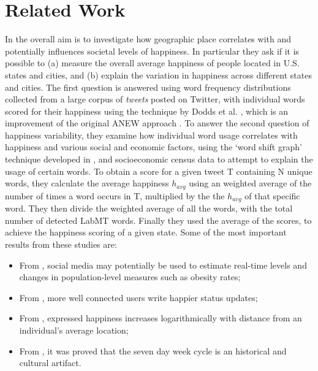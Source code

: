 \documentclass{llncs}
\begin{document}
\section{Related Work}
\label{sec:rw}

In \cite{Mitchell2013,Dodds2011,Frank2013,Bliss2012} the overall aim is to investigate how geographic place correlates with and potentially influences societal levels of happiness. In particular they ask if it is possible to (a) measure the overall average happiness of people located in U.S. states and cities, and (b) explain the variation in happiness across different states and cities. The first question is answered using word frequency distributions collected from a large corpus of \emph{tweets} posted on Twitter, with individual words scored for their happiness using the technique by Dodds et al. \cite{Dodds2009}, which is an improvement of the original ANEW approach \cite{Bradley1999}. To answer the second question of happiness variability, they examine how individual word usage correlates with happiness and various social and economic factors, using the `word shift graph' technique developed in \cite{Dodds2011,Dodds2009}, and socioeconomic census data to attempt to explain the usage of certain words. To obtain a score for a given tweet T containing N unique words, they calculate the average happiness $h_{avg}$ using an weighted average of the number of times a word occurs in T, multiplied by the the $h_{avg}$ of that specific word. They then divide the weighted average of all the words, with the total number of detected LabMT words. Finally they used the average of the scores, to achieve the happiness scoring of a given state. Some of the most important results from these studies are:
\begin{itemize}
\item From \cite{Mitchell2013}, social media may potentially be used to estimate real-time levels and changes in population-level measures such as obesity rates;
\item From \cite{Bliss2012}, more well connected users write happier status updates;
\item From \cite{Frank2013}, expressed happiness increases logarithmically with distance from an individual’s average location;
\item From \cite{Dodds2011}, it was proved that the seven day week cycle is an historical and cultural artifact.
\end{itemize}
\end{document}

